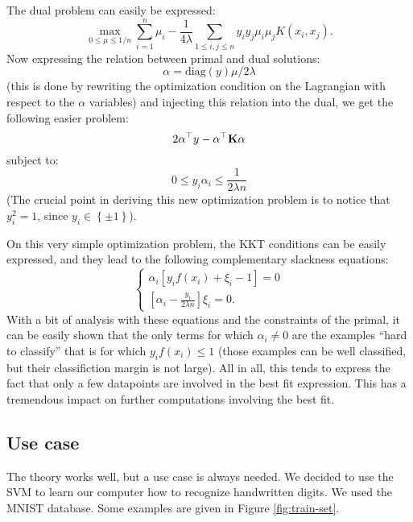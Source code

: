 \documentclass[a4paper, 11pt]{article}
\newcommand{\K}{\bold{K}}
\newcommand{\pmset}{\left\{\pm1\right\}}
\begin{document}
The dual problem can easily be expressed:
\begin{equation}
  \max\limits_{0\leq\mu\leq 1/n}
  \sum\limits_{i=1}^n\mu_i
  - \frac{1}{4\lambda}\sum\limits_{1\leq i,j \leq n}y_iy_j\mu_i\mu_jK(x_i, x_j).
\end{equation}
Now expressing the relation between primal and dual solutions:
\begin{equation}
  \alpha = \text{diag}(y)\mu/2\lambda
\end{equation}
(this is done by rewriting the optimization condition on the
Lagrangian with respect to the $\alpha$ variables)
and injecting this relation into the dual, we get the following
easier problem:
\begin{equation}
  2\alpha^\top y - \alpha^\top \K \alpha
\end{equation}
subject to:
\begin{equation}
  0 \leq y_i\alpha_i \leq \frac{1}{2\lambda n}
\end{equation}
(The crucial point in deriving this new optimization problem is
to notice that $y_i^2 = 1$, since $y_i \in \pmset$).

On this very simple optimization problem, the KKT conditions can
be easily expressed, and they lead to the following complementary
slackness equations:
\begin{equation}
  \begin{cases}
    \alpha_i\left[y_if(x_i) + \xi_i - 1\right] = 0\\
    \left[\alpha_i - \frac{y_i}{2\lambda n}\right]\xi_i = 0.
  \end{cases}
\end{equation}
With a bit of analysis with these equations and the constraints
of the primal, it can be easily shown that the only terms for
which $\alpha_i \neq 0$ are the examples ``hard to classify'' that
is for which $y_i f(x_i) \leq 1$ (those examples can be well
classified, but their classifiction margin is not large). All in
all, this tends to express the fact that only a few datapoints
are involved in the best fit expression. This has a tremendous
impact on further computations involving the best fit.

\subsection{Use case}

The theory works well, but a use case is always needed. We decided to use the SVM to learn our computer how to recognize handwritten digits. We used the MNIST database. Some examples are given in Figure \ref{fig:train-set}. 
\end{document}

